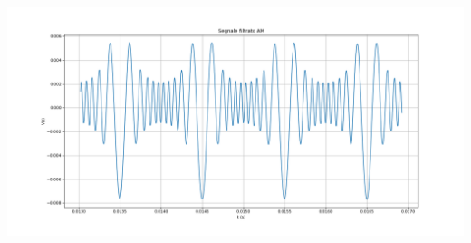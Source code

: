 \documentclass{article}
\begin{document}
\begin{center}
    \includegraphics[width=\textwidth]{filtrato.png}
\end{center}
\end{document}
